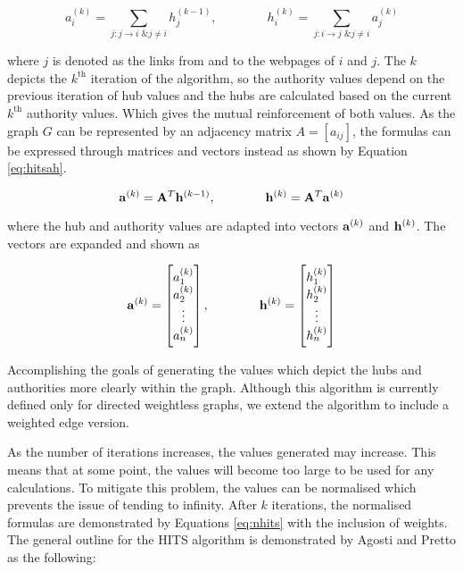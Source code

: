 \begin{equation}
a_i^{(k)} = \sum_{j:j\rightarrow i \text{ \& } j \ne i}h_j^{(k-1)} , \qquad \qquad h_i^{(k)} = \sum_{j:i \rightarrow j \text{ \& } j \ne i}a_j^{(k)}
\end{equation}

where $j$ is denoted as the links from and to the webpages of $i$ and $j$. The $k$ depicts the $k^{\text{th}}$ iteration of the algorithm, so the authority values depend on the previous iteration of hub values and the hubs are calculated based on the current $k^{\text{th}}$ authority values. Which gives the mutual reinforcement of both values. As the graph $G$ can be represented by an adjacency matrix $A = [a_{ij}]$, the formulas can be expressed through matrices \cite{chatzigeorgiou2006application} and vectors instead as shown by Equation \ref{eq:hitsah}.

\begin{equation}\label{eq:hitsah}
\bold{a}^{(k)} = \bold{A}^{T}\bold{h}^{(k-1)} , \qquad \qquad \bold{h}^{(k)} = \bold{A}^{T}\bold{a}^{(k)}
\end{equation}

where the hub and authority values are adapted into vectors $\bold{a}^{(k)}$ and $\bold{h}^{(k)}$. The vectors are expanded and shown as

\begin{equation}
\bold{a}^{(k)} = \begin{bmatrix}
           a_1^{(k)} \\
           a_2^{(k)} \\
           \vdots \\
           a_n^{(k)}
         	\end{bmatrix}
           , \qquad \qquad 
\bold{h}^{(k)} = \begin{bmatrix}
           h_{1}^{(k)} \\
           h_{2}^{(k)} \\
           \vdots \\
           h_{n}^{(k)}
         	\end{bmatrix}
\end{equation}

Accomplishing the goals of generating the values which depict the hubs and authorities more clearly within the graph. Although this algorithm is currently defined only for directed weightless graphs, we extend the algorithm to include a weighted edge version.

As the number of iterations increases, the values generated may increase. This means that at some point, the values will become too large to be used for any calculations. To mitigate this problem, the values can be normalised which prevents the issue of tending to infinity. After $k$ iterations, the normalised formulas are demonstrated by Equations \ref{eq:nhits} with the inclusion of weights. The general outline for the HITS algorithm is demonstrated by Agosti and Pretto \cite{agosti2005theoretical} as the following:
\newline

